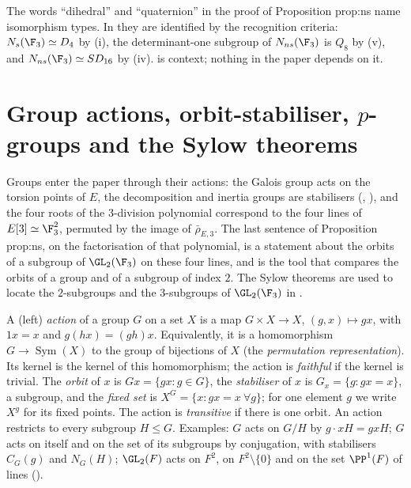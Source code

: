 \begin{paperlink}
The words ``dihedral'' and ``quaternion'' in the proof of Proposition prop:ns name isomorphism types. In
 they are identified by the recognition criteria: $N_s(\F_3)\simeq D_4$ by (i), the
determinant-one subgroup of $N_{ns}(\F_3)$ is $Q_8$ by (v), and $N_{ns}(\F_3)\simeq SD_{16}$ by
(iv).  is context; nothing in the paper depends on it.
\end{paperlink}

\section[Group actions, orbit-stabiliser, \texorpdfstring{$p$}{p}-groups, Sylow theorems]{Group actions, orbit-stabiliser, \texorpdfstring{$p$}{p}-groups and the Sylow theorems}\label{sec:groups:actions}

Groups enter the paper through their actions: the Galois group acts on the torsion points of $E$, the decomposition and inertia groups are
stabilisers (, ), and the four roots of the $3$-division polynomial correspond to the four lines of
$E[3]\simeq\F_3^2$, permuted by the image of $\bar\rho_{E,3}$. The last sentence of Proposition prop:ns, on the factorisation of that
polynomial, is a statement about the orbits of a subgroup of $\GL_2(\F_3)$ on these four lines, and  is the
tool that compares the orbits of a group and of a subgroup of index $2$. The Sylow theorems are used to locate the $2$-subgroups and the
$3$-subgroups of $\GL_2(\F_3)$ in .

\begin{definition}\label{def:groups:action}
A (left) \emph{action} of a group $G$ on a set $X$ is a map $G\times X\to X$, $(g,x)\mapsto gx$, with $1x=x$ and $g(hx)=(gh)x$. Equivalently, it is a
homomorphism $G\to\operatorname{Sym}(X)$ to the group of bijections of $X$ (the \emph{permutation representation}). Its kernel is the kernel of this
homomorphism; the action is \emph{faithful} if the kernel is trivial. The \emph{orbit} of $x$ is $Gx=\{gx:g\in G\}$, the \emph{stabiliser} of $x$ is
$G_x=\{g:gx=x\}$, a subgroup, and the \emph{fixed set} is $X^G=\{x:gx=x\ \forall g\}$; for one element $g$ we write $X^g$ for its fixed points. The action is
\emph{transitive} if there is one orbit. An action restricts to every subgroup $H\le G$. Examples: $G$ acts on $G/H$ by $g\cdot xH=gxH$; $G$ acts on itself
and on the set of its subgroups by conjugation, with stabilisers $C_G(g)$ and $N_G(H)$; $\GL_2(F)$ acts on $F^2$, on $F^2\setminus\{0\}$ and on
the set $\PP^1(F)$ of lines ().
\end{definition}

